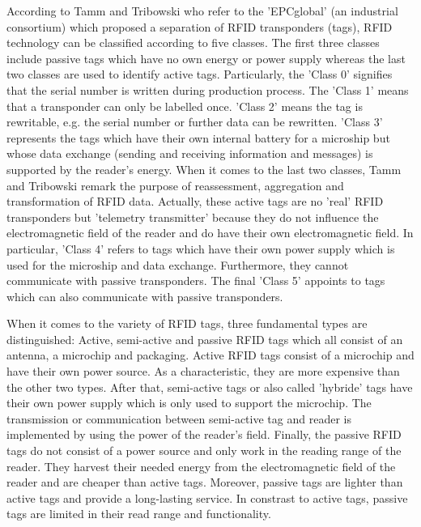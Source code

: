 According to Tamm and Tribowski \cite[p.15 ff.]{fokus} who refer to the 'EPCglobal' (an industrial consortium) which proposed a separation of RFID transponders (tags), RFID technology can be classified according to five classes\label{classes}. The first three classes include passive tags which have no own energy or power supply whereas the last two classes are used to identify active tags. Particularly, the 'Class 0' signifies that the serial number is written during production process. The 'Class 1' means that a transponder can only be labelled once. 'Class 2' means the tag is rewritable, e.g. the serial number or further data can be rewritten. 'Class 3' represents the tags which have their own internal battery for a microship but whose data exchange (sending and receiving information and messages) is supported by the reader's energy. When it comes to the last two classes, Tamm and Tribowski remark the purpose of reassessment, aggregation and transformation of RFID data. Actually, these active tags are no 'real' RFID transponders but 'telemetry transmitter' because they do not influence the electromagnetic field of the reader and do have their own electromagnetic field. In particular, 'Class 4' refers to tags which have their own power supply which is used for the microship and data exchange. Furthermore, they cannot communicate with passive transponders. The final 'Class 5' appoints to tags which can also communicate with passive transponders. 

When it comes to the variety of RFID tags, three fundamental types are distinguished: Active, semi-active and passive RFID tags \cite{henrici} which all consist of an antenna, a microchip and packaging. Active RFID tags consist of a microchip and have their own power source. As a characteristic, they are more expensive than the other two types. After that, semi-active tags or also called 'hybride' tags have their own power supply which is only used to support the microchip. The transmission or communication between semi-active tag and reader is implemented by using the power of the reader's field. Finally, the passive RFID tags do not consist of a power source and only work in the reading range of the reader. They harvest their needed energy from the electromagnetic field of the reader and are cheaper than active tags. Moreover, passive tags are lighter than active tags and provide a long-lasting service. In constrast to active tags, passive tags are limited in their read range and functionality.

